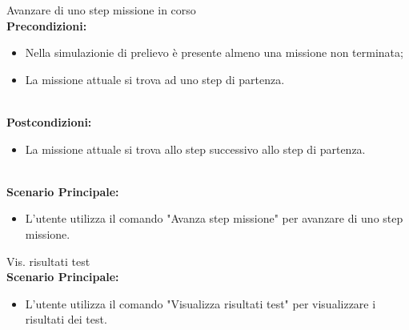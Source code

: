 \begin{usecase}{11}{Avanzare di uno step missione in corso}
\textbf{\\Precondizioni:}
\begin{itemize}
    \item Nella simulazionie di prelievo è presente almeno una missione non terminata;
    \item La missione attuale si trova ad uno step di partenza.
\end{itemize}
\textbf{\\Postcondizioni:}
\begin{itemize}
    \item La missione attuale si trova allo step successivo allo step di partenza.
\end{itemize}
\textbf{\\Scenario Principale:}
\begin{itemize}
    \item L'utente utilizza il comando "Avanza step missione" per avanzare di uno step missione.
\end{itemize}
\label{uc:scenario-principale}
\end{usecase}
\begin{usecase}{12}{Vis. risultati test}
\textbf{\\Scenario Principale:}
\begin{itemize}
    \item L'utente utilizza il comando "Visualizza risultati test" per visualizzare i risultati dei test.
\end{itemize}
\label{uc:scenario-principale}
\end{usecase}
